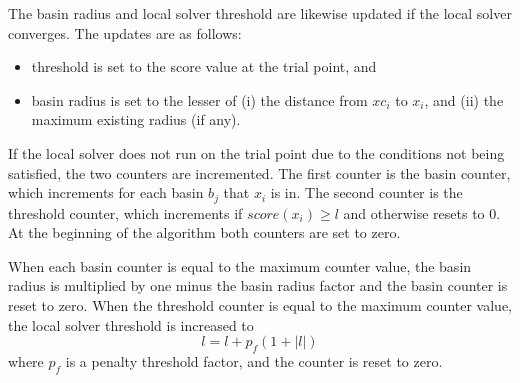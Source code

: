 The basin radius and local solver threshold are likewise updated if the local solver converges. The updates are as follows:
\begin{itemize}
    \item threshold is set to the score value at the trial point, and
    \item basin radius is set to the lesser of (i) the distance from $xc_i$ to $x_i$, and (ii) the maximum existing radius (if any).
\end{itemize}

If the local solver does not run on the trial point due to the conditions not being satisfied, the two counters are incremented. The first counter is the basin counter, which increments for each basin $b_j$ that $x_i$ is in. The second counter is the threshold counter, which increments if $score(x_i) \geq l$ and otherwise resets to 0. At the beginning of the algorithm both counters are set to zero. 

When each basin counter is equal to the maximum counter value, the basin radius is multiplied by one minus the basin radius factor and the basin counter is reset to zero. When the threshold counter is equal to the maximum counter value, the local solver threshold is increased to
\begin{equation}
    l = l + p_f(1+|l|)
\end{equation}
where $p_f$ is a penalty threshold factor, and the counter is reset to zero.

